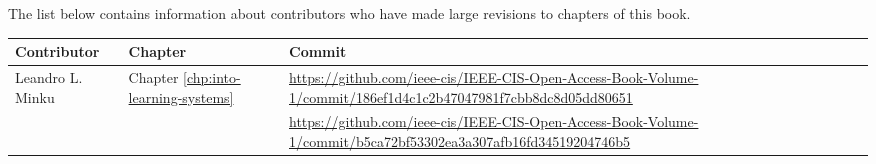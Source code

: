 
\contributors

The list below contains information about contributors who have made large revisions to chapters of this book.

\begin{center}
\begin{tabularx}{1.2\textwidth}{|l|l|X|} \hline
Contributor & Chapter & Commit \\ \hline
Leandro L. Minku & Chapter \ref{chp:into-learning-systems} & \url{https://github.com/ieee-cis/IEEE-CIS-Open-Access-Book-Volume-1/commit/186ef1d4c1c2b47047981f7cbb8dc8d05dd80651} \\ 
& & \url{https://github.com/ieee-cis/IEEE-CIS-Open-Access-Book-Volume-1/commit/b5ca72bf53302ea3a307afb16fd34519204746b5} \\ \hline

\end{tabularx}
\end{center}
